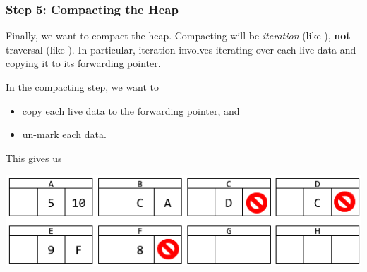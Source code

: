 
\subsubsection{Step 5: Compacting the Heap}
\begin{mdframed}
    Finally, we want to compact the heap. Compacting will be \emph{iteration} (like ), \textbf{not} traversal (like ). In particular, iteration involves iterating over each live data and copying it to its forwarding pointer.
\end{mdframed}

In the compacting step, we want to 
\begin{itemize}
    \item copy each live data to the forwarding pointer, and 
    \item un-mark each data.
\end{itemize}
This gives us 
\begin{center}
    \includegraphics[scale=0.6]{assets/GCAlg5.png}
\end{center}